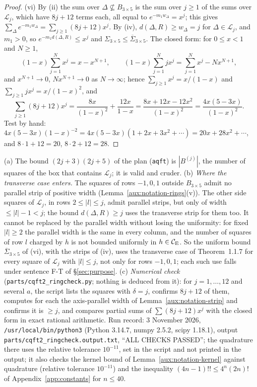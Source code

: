 \begin{proof}
(vi) By (ii) the sum over $\Delta\not\subseteq B_{3\times5}$ is the sum over $j\ge1$ of the
sums over $\mathcal L_j$, which have $8j+12$ terms each, all equal to $e^{-m_1w_\Delta}=x^j$;
this gives $\sum_\Delta e^{-m_1w_\Delta}=\sum_{j\ge1}(8j+12)x^j$.  By (iv), $d(\Delta,R)\ge
w_\Delta=j$ for $\Delta\in\mathcal L_j$, and $m_1>0$, so $e^{-m_1d(\Delta,R)}\le x^j$ and
$\Sigma_{3\times5}\le\overline\Sigma_{3\times5}$.  The closed form: for $0\le x<1$ and $N\ge1$,
\[
 (1-x)\sum_{j=1}^Nx^j=x-x^{N+1},\qquad
 (1-x)\sum_{j=1}^Njx^j=\sum_{j=1}^Nx^j-Nx^{N+1},
\]
and $x^{N+1}\to0$, $Nx^{N+1}\to0$ as $N\to\infty$; hence $\sum_{j\ge1}x^j=x/(1-x)$ and
$\sum_{j\ge1}jx^j=x/(1-x)^2$, and
\[
 \sum_{j\ge1}(8j+12)x^j=\frac{8x}{(1-x)^2}+\frac{12x}{1-x}
 =\frac{8x+12x-12x^2}{(1-x)^2}=\frac{4x(5-3x)}{(1-x)^2} .
\]
Test by hand: $4x(5-3x)(1-x)^{-2}=4x(5-3x)(1+2x+3x^2+\cdots)=20x+28x^2+\cdots$, and
$8\cdot1+12=20$, $8\cdot2+12=28$.
\end{proof}

\begin{auxrem}\label{aux:notation-ringrem}
(a) The bound $(2j+3)(2j+5)$ of the plan (\texttt{aqft}) is $|B^{(j)}|$, the number of
squares of the box that contains $\mathcal L_j$; it is valid and cruder.
(b) \emph{Where the transverse case enters.}  The squares of rows $-1,0,1$ outside
$B_{3\times5}$ admit no parallel strip of positive width
(Lemma~\ref{aux:notation-rings}(v)).  The other side squares of $\mathcal L_j$, in rows
$2\le|l|\le j$, admit parallel strips, but only of width $\le|l|-1<j$; the bound
$d(\Delta,R)\ge j$ uses the transverse strip for them too.  It cannot be replaced by the
parallel width without losing the uniformity: for fixed $|l|\ge2$ the parallel width is the
same in every column, and the number of squares of row $l$ charged by $h$ is not bounded
uniformly in $h\in\mathcal{C}_{\mathrm E}$.  So the uniform bound $\overline\Sigma_{3\times5}$ of (vi), with the
strips of (iv), uses the transverse case of Theorem~1.1.7
for every square of $\mathcal L_j$ with $|l|\le j$, not only for rows $-1,0,1$; each such
use falls under sentence F-T of \S\ref{sec:purpose}.
(c) \emph{Numerical check} (\texttt{parts/cqft2\_ringcheck.py}; nothing is deduced from
it): for $j=1,\dots,12$ and several $a$, the script lists the squares with $\delta=j$,
confirms $8j+12$ of them, computes for each the axis-parallel width of
Lemma~\ref{aux:notation-strip} and confirms it is $\ge j$, and compares partial sums of
$\sum(8j+12)x^j$ with the closed form in exact rational arithmetic.  Run record: 3 November 2026,
\texttt{/usr/local/bin/python3} (Python 3.14.7, numpy 2.5.2, scipy 1.18.1), output
\texttt{parts/cqft2\_ringcheck.output.txt}, ``ALL CHECKS PASSED''; the quadrature there uses
the relative tolerance $10^{-11}$, set in the script and not printed in the output; it also checks the kernel
bound of Lemma~\ref{aux:notation-kernel} against quadrature (relative tolerance $10^{-11}$) and
the inequality $(4n-1)!!\le4^n(2n)!$ of Appendix~\ref{app:constants} for $n\le40$.
\end{auxrem}

